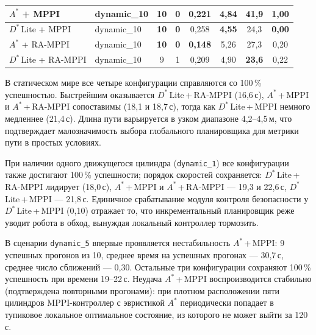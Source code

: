 \documentclass[a4paper,12pt]{extarticle}
\begin{document}
\begin{table}[H]
\begin{tabular}{|l|l|c|c|c|c|c|c|}
            $A^*$    + MPPI       & dynamic\_10 & \textbf{10} & \textbf{0} & 0{,}221 & 4{,}84 & 41{,}9 & 1{,}00 \\\hline
            $D^*$\,Lite + MPPI    & dynamic\_10 & \textbf{10} & \textbf{0} & 0{,}258 & \textbf{4{,}55} & 24{,}3 & \textbf{0{,}00} \\\hline
            $A^*$    + RA-MPPI    & dynamic\_10 & \textbf{10} & \textbf{0} & \textbf{0{,}148} & 5{,}26 & 27{,}3 & 0{,}20 \\\hline
            $D^*$\,Lite + RA-MPPI & dynamic\_10 &  9 & 1 & 0{,}209 & 4{,}90 & \textbf{23{,}6} & 0{,}22 \\\hline
        \end{tabular}
    \end{table}

    В статическом мире все четыре конфигурации справляются со 100\,\% успешностью.
    Быстрейшим оказывается $D^*$\,Lite\,+\,RA-MPPI (16{,}6\,с), $A^*$\,+\,MPPI
    и $A^*$\,+\,RA-MPPI сопоставимы (18{,}1 и 18{,}7\,с), тогда как
    $D^*$\,Lite\,+\,MPPI немного медленнее (21{,}4\,с).
    Длина пути варьируется в узком диапазоне 4{,}2--4{,}5\,м, что
    подтверждает малозначимость выбора глобального планировщика для
    метрики пути в простых условиях.

    При наличии одного движущегося цилиндра (\texttt{dynamic\_1}) все конфигурации
    также достигают 100\,\% успешности; порядок скоростей сохраняется:
    $D^*$\,Lite\,+\,RA-MPPI лидирует (18{,}0\,с), $A^*$\,+\,MPPI и
    $A^*$\,+\,RA-MPPI — 19{,}3 и 22{,}6\,с, $D^*$\,Lite\,+\,MPPI — 21{,}8\,с.
    Единичное срабатывание модуля контроля безопасности у $D^*$\,Lite\,+\,MPPI (0{,}10)
    отражает то, что инкрементальный планировщик реже уводит робота
    в обход, вынуждая локальный контроллер тормозить.

    В сценарии \texttt{dynamic\_5} впервые проявляется нестабильность
    $A^*$\,+\,MPPI: 9 успешных прогонов из 10, среднее время на успешных
    прогонах — 30{,}7\,с, среднее число сближений — 0{,}30.
    Остальные три конфигурации сохраняют 100\,\% успешность при времени
    19--22\,с. Неудача $A^*$\,+\,MPPI воспроизводится стабильно
    (подтверждена повторными прогонами): при плотном расположении пяти
    цилиндров MPPI-контроллер с эвристикой $A^*$ периодически попадает
    в тупиковое локальное оптимальное состояние, из которого не может
    выйти за 120\,с.
\end{document}
